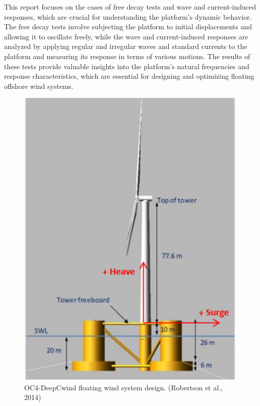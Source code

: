 \documentclass[a4paper, 11pt]{article}
\begin{document}
This report focuses on the cases of free decay tests and wave and current-induced responses, which are crucial for understanding the platform's dynamic behavior. The free decay tests involve subjecting the platform to initial displacements and allowing it to oscillate freely, while the wave and current-induced responses are analyzed by applying regular and irregular waves and standard currents to the platform and measuring its response in terms of various motions.
The results of these tests provide valuable insights into the platform's natural frequencies and response characteristics, which are essential for designing and optimizing floating offshore wind systems.
\vspace{0.5cm}

\begin{figure}[H]
    \begin{minipage}{0.47\textwidth}
        \centering
        \includegraphics[width=0.99\textwidth]{OC4.png}
        \caption{\small OC4-DeepCwind floating wind system design. (Robertson et al., 2014)}

\end{minipage}
\end{figure}
\end{document}
